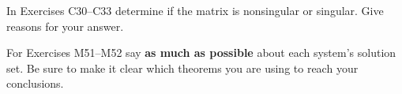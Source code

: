 \begin{exercisegroup}
\begin{para}In Exercises C30--C33 determine if the matrix is nonsingular or singular.  Give reasons for your answer.\end{para}
\end{exercisegroup}
%
%
%
%
\begin{exercisegroup}
\begin{para}For Exercises M51--M52  say {\bf as much as possible} about each system's solution set.  Be sure to make it clear which theorems you are using to reach your conclusions.\end{para}
\end{exercisegroup}
%
